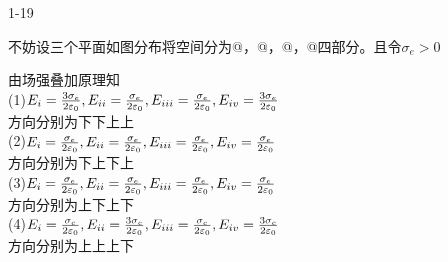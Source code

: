 \documentclass{phyasgn}
\makeatletter
\newcommand{\rmnum}[1]{\romannumeral #1}
\newcommand{\Rmnum}[1]{\expandafter\@slowromancap\romannumeral #1@}
\makeatother
\begin{document}
{\heiti\color{red} 1-19}
\begin{sol}
    不妨设三个平面如图分布将空间分为\Rmnum{1}，\Rmnum{2}，\Rmnum{3}，\Rmnum{4}四部分。且令$\sigma_e>0$\newpage
    \begin{figure}[htbp]
    \end{figure}\par
    
由场强叠加原理知\\
(1)$E_{\rmnum{1}}=\frac{3\sigma_e}{2\varepsilon_0},E_{\rmnum{2}}=\frac{\sigma_e}{2\varepsilon_0},E_{\rmnum{3}}=\frac{\sigma_e}{2\varepsilon_0},E_{\rmnum{4}}=\frac{3\sigma_e}{2\varepsilon_0}$\\
方向分别为下下上上\\
(2)$E_{\rmnum{1}}=\frac{\sigma_e}{2\varepsilon_0},E_{\rmnum{2}}=\frac{\sigma_e}{2\varepsilon_0},E_{\rmnum{3}}=\frac{\sigma_e}{2\varepsilon_0},E_{\rmnum{4}}=\frac{\sigma_e}{2\varepsilon_0}$\\
方向分别为下上下上\\
(3)$E_{\rmnum{1}}=\frac{\sigma_e}{2\varepsilon_0},E_{\rmnum{2}}=\frac{\sigma_e}{2\varepsilon_0},E_{\rmnum{3}}=\frac{\sigma_e}{2\varepsilon_0},E_{\rmnum{4}}=\frac{\sigma_e}{2\varepsilon_0}$\\
方向分别为上下上下\\
(4)$E_{\rmnum{1}}=\frac{\sigma_e}{2\varepsilon_0},E_{\rmnum{2}}=\frac{3\sigma_e}{2\varepsilon_0},E_{\rmnum{3}}=\frac{\sigma_e}{2\varepsilon_0},E_{\rmnum{4}}=\frac{3\sigma_e}{2\varepsilon_0}$\\
方向分别为上上上下\\
\end{sol}\par
\end{document}
